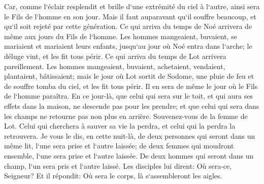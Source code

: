 \verse Car, comme l`éclair resplendit et brille d`une extrémité du ciel à l`autre, ainsi sera le Fils de l`homme en son jour. 
\verse Mais il faut auparavant qu`il souffre beaucoup, et qu`il soit rejeté par cette génération. 
\verse Ce qui arriva du temps de Noé arrivera de même aux jours du Fils de l`homme. 
\verse Les hommes mangeaient, buvaient, se mariaient et mariaient leurs enfants, jusqu`au jour où Noé entra dans l`arche; le déluge vint, et les fit tous périr. 
\verse Ce qui arriva du temps de Lot arrivera pareillement. Les hommes mangeaient, buvaient, achetaient, vendaient, plantaient, bâtissaient; 
\verse mais le jour où Lot sortit de Sodome, une pluie de feu et de souffre tomba du ciel, et les fit tous périr. 
\verse Il en sera de même le jour où le Fils de l`homme paraîtra. 
\verse En ce jour-là, que celui qui sera sur le toit, et qui aura ses effets dans la maison, ne descende pas pour les prendre; et que celui qui sera dans les champs ne retourne pas non plus en arrière. 
\verse Souvenez-vous de la femme de Lot. 
\verse Celui qui cherchera à sauver sa vie la perdra, et celui qui la perdra la retrouvera. 
\verse Je vous le dis, en cette nuit-là, de deux personnes qui seront dans un même lit, l`une sera prise et l`autre laissée; 
\verse de deux femmes qui moudront ensemble, l`une sera prise et l`autre laissée. 
\verse De deux hommes qui seront dans un champ, l`un sera pris et l`autre laissé. 
\verse Les disciples lui dirent: Où sera-ce, Seigneur? Et il répondit: Où sera le corps, là s`assembleront les aigles. 

\chapter{}

